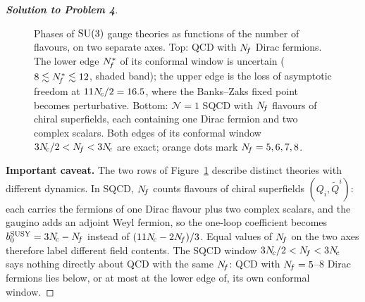 \documentclass[11pt,a4paper]{article}
\begin{document}
\begin{proof}[\textbf{Solution to Problem 4}]
\begin{figure}[h]
\caption{Phases of $\mathrm{SU}(3)$ gauge theories as functions of the number of
  flavours, on two separate axes.  Top: QCD with $N_{\!f}$ Dirac fermions.
  The lower edge $N_{\!f}^*$ of its conformal window is uncertain
  ($8 \lesssim N_{\!f}^* \lesssim 12$, shaded band); the upper edge is the
  loss of asymptotic freedom at $11N_{\!c}/2 = 16.5$, where the Banks--Zaks
  fixed point becomes perturbative.  Bottom: $\mathcal{N}=1$ SQCD with
  $N_{\!f}$ flavours of chiral superfields, each containing one Dirac fermion
  and two complex scalars.  Both edges of its conformal window
  $3N_{\!c}/2 < N_{\!f} < 3N_{\!c}$ are exact; orange dots mark $N_{\!f} = 5,6,7,8$.}
\label{fig:ex-phase-diagram}
\end{figure}

\noindent\textbf{Important caveat.}
The two rows of Figure~\ref{fig:ex-phase-diagram} describe distinct
theories with different dynamics.  In SQCD, $N_{\!f}$ counts flavours of
chiral superfields $(Q_i, \widetilde{Q}^i)$: each carries the fermions
of one Dirac flavour plus two complex scalars, and the gaugino adds an
adjoint Weyl fermion, so the one-loop coefficient becomes
$b_0^{\mathrm{SUSY}} = 3N_{\!c} - N_{\!f}$ instead of $(11N_{\!c} - 2N_{\!f})/3$.
Equal values of $N_{\!f}$ on the two axes therefore label different field
contents.  The SQCD window $3N_{\!c}/2 < N_{\!f} < 3N_{\!c}$ says nothing directly
about QCD with the same $N_{\!f}$: QCD with $N_{\!f} = 5$--$8$ Dirac fermions
lies below, or at most at the lower edge of, its own conformal window.


\end{proof}
\end{document}
